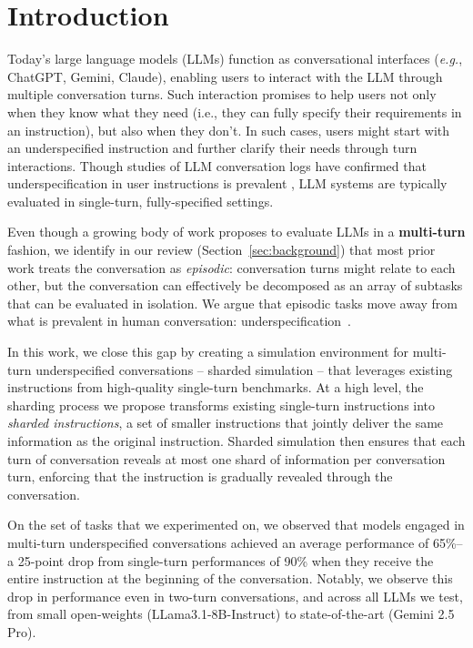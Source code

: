 \documentclass{article}
\begin{document}

\section{Introduction} \label{sec:intro}

Today's large language models (LLMs) function as conversational interfaces (\textit{e.g.}, ChatGPT, Gemini, Claude), enabling users to interact with the LLM through multiple conversation turns. Such interaction promises to help users not only when they know what they need (i.e., they can fully specify their requirements in an instruction), but also when they don't. In such cases, users might start with an underspecified instruction and further clarify their needs through turn interactions.
Though studies of LLM conversation logs have confirmed that underspecification in user instructions is prevalent \citep{herlihy2024overcoming}, LLM systems are typically evaluated in single-turn, fully-specified settings.

Even though a growing body of work proposes to evaluate LLMs in a \textbf{multi-turn} fashion, we identify in our review (Section~\ref{sec:background}) that most prior work treats the conversation as \textit{episodic}: conversation turns might relate to each other, but the conversation can effectively be decomposed as an array of subtasks that can be evaluated in isolation.
We argue that episodic tasks move away from what is prevalent in human conversation: underspecification~\cite{zipf1949human,herlihy2024overcoming}.

In this work, we close this gap by creating a simulation environment for multi-turn underspecified conversations  -- sharded simulation -- that leverages existing instructions from high-quality single-turn benchmarks. At a high level, the sharding process we propose transforms existing single-turn instructions into \textit{sharded instructions}, a set of smaller instructions that jointly deliver the same information as the original instruction. Sharded simulation then ensures that each turn of conversation reveals at most one shard of information per conversation turn, enforcing that the instruction is gradually revealed through the conversation.

On the set of tasks that we experimented on, we observed that models engaged in multi-turn underspecified conversations achieved an average performance of 65\%--a 25-point drop from single-turn performances of 90\% when they receive the entire instruction at the beginning of the conversation.
Notably, we observe this drop in performance even in two-turn conversations, and across all LLMs we test, from small open-weights (LLama3.1-8B-Instruct) to state-of-the-art (Gemini 2.5 Pro).
\end{document}
